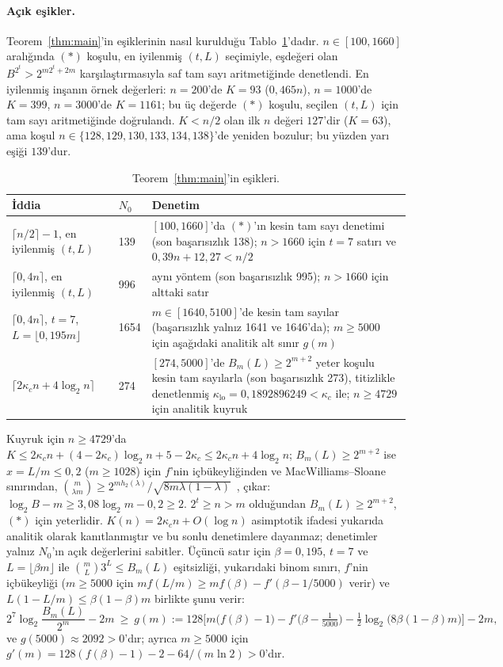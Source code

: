 \documentclass[aps,pra,onecolumn,superscriptaddress,nofootinbib,longbibliography,10pt]{revtex4-2}
\theoremstyle{definition}
\newcommand{\kc}{\kappa_c}
\begin{document}
\paragraph*{Açık eşikler.} Teorem~\ref{thm:main}'in eşiklerinin nasıl kurulduğu Tablo~\ref{tab:N0}'dadır. $n\in[100, 1660]$ aralığında $(*)$ koşulu, en iyilenmiş $(t,L)$ seçimiyle, eşdeğeri olan $B^{2^t}>2^{m2^t+2m}$ karşılaştırmasıyla saf tam sayı aritmetiğinde denetlendi. En iyilenmiş inşanın örnek değerleri: $n=200$'de $K=93$ ($0{,}465n$), $n=1000$'de $K=399$, $n=3000$'de $K=1161$; bu üç değerde $(*)$ koşulu, seçilen $(t,L)$ için tam sayı aritmetiğinde doğrulandı. $K<n/2$ olan ilk $n$ değeri $127$'dir ($K=63$), ama koşul $n\in\{128{,}129{,}130{,}133{,}134{,}138\}$'de yeniden bozulur; bu yüzden yarı eşiği $139$'dur.

\begin{table}[h]
\caption{Teorem~\ref{thm:main}'in eşikleri.}\label{tab:N0}
\begin{tabular}{p{}p{}p{}}
\toprule
İddia & $N_0$ & Denetim\\
\midrule
$\lceil n/2\rceil-1$, en iyilenmiş $(t,L)$ & 139 & $[100, 1660]$'da $(*)$'ın kesin tam sayı denetimi (son başarısızlık 138); $n>1660$ için $t=7$ satırı ve $0{,}39n+12{,}27<n/2$\\
$\lceil0{,}4n\rceil$, en iyilenmiş $(t,L)$ & 996 & aynı yöntem (son başarısızlık 995); $n>1660$ için alttaki satır\\
$\lceil0{,}4n\rceil$, $t=7$, $L=\lfloor0{,}195m\rfloor$ & 1654 & $m\in[1640, 5100]$'de kesin tam sayılar (başarısızlık yalnız 1641 ve 1646'da); $m\ge5000$ için aşağıdaki analitik alt sınır $g(m)$\\
$\lceil2\kc n+4\log_2n\rceil$ & 274 & $[274, 5000]$'de $B_m(L)\ge2^{m+2}$ yeter koşulu kesin tam sayılarla (son başarısızlık 273), titizlikle denetlenmiş $\kappa_{\mathrm{lo}}=0{,}1892896249<\kc$ ile; $n\ge4729$ için analitik kuyruk\\
\bottomrule
\end{tabular}
\end{table}

\noindent Kuyruk için $n\ge4729$'da $K\le2\kc n+(4-2\kc)\log_2n+5-2\kc\le2\kc n+4\log_2n$; $B_m(L)\ge2^{m+2}$ ise $x=L/m\le0{,}2$ ($m\ge1028$) için $f$'nin içbükeyliğinden ve MacWilliams--Sloane sınırından, $\binom{m}{\lambda m}\ge2^{mh_2(\lambda)}/\sqrt{8m\lambda(1-\lambda)}$~\cite{MS77}, çıkar: $\log_2B-m\ge3{,}08\log_2m-0{,}2\ge2$. $2^t\ge n>m$ olduğundan $B_m(L)\ge2^{m+2}$, $(*)$ için yeterlidir. $K(n)=2\kc n+O(\log n)$ asimptotik ifadesi yukarıda analitik olarak kanıtlanmıştır ve bu sonlu denetimlere dayanmaz; denetimler yalnız $N_0$'ın açık değerlerini sabitler. Üçüncü satır için $\beta=0{,}195$, $t=7$ ve $L=\lfloor\beta m\rfloor$ ile $\binom mL3^L\le B_m(L)$ eşitsizliği, yukarıdaki binom sınırı, $f$'nin içbükeyliği ($m\ge5000$ için $mf(L/m)\ge mf(\beta)-f'(\beta-1/5000)$ verir) ve $L(1-L/m)\le\beta(1-\beta)m$ birlikte şunu verir:
\[
2^7\log_2\frac{B_m(L)}{2^m}-2m\ \ge\ g(m):=128\Big[m\big(f(\beta)-1\big)-f'\big(\beta-\tfrac{1}{5000}\big)-\tfrac12\log_2\big(8\beta(1-\beta)m\big)\Big]-2m,
\]
ve $g(5000)\approx2092>0$'dır; ayrıca $m\ge5000$ için $g'(m)=128(f(\beta)-1)-2-64/(m\ln2)>0$'dır.
\end{document}
